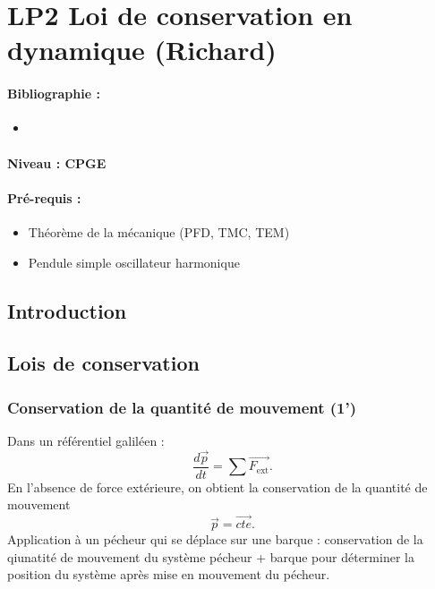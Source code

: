 \section{LP2 Loi de conservation en dynamique (Richard)}

\paragraph{Bibliographie :}
\begin{itemize}
\item 
\end{itemize}

\paragraph{Niveau : CPGE} 

\paragraph{Pré-requis :}
\begin{itemize}
\item Théorème de la mécanique (PFD, TMC, TEM)
\item Pendule simple oscillateur harmonique
\end{itemize}

\subsection{Introduction}

\subsection{Lois de conservation}

\subsubsection{Conservation de la quantité de mouvement (1')}

Dans un référentiel galiléen  :
\begin{equation}
\frac{d\overrightarrow{p}}{dt} = \sum \overrightarrow{F_\mathrm{ext}}.
\end{equation}
En l'absence de force extérieure, on obtient la conservation de la quantité de mouvement
\begin{equation}
\overrightarrow{p} = \overrightarrow{cte}.
\end{equation}
Application à un pécheur qui se déplace sur une barque : conservation de la qiunatité de mouvement du système pécheur + barque pour déterminer la position du système après mise en mouvement du pécheur.

